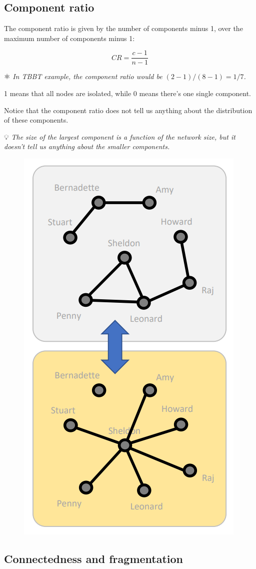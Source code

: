 \documentclass[
  notitlepage,
  onecolumn,
  openany]{book}
\begin{document}
\hypertarget{component-ratio}{%
\subsection{Component ratio}\label{component-ratio}}

The component ratio is given by the number of components minus 1, over the maximum number of components minus 1:

\[
CR = \frac{c-1}{n-1}
\]

⚛️ \emph{In TBBT example, the component ratio would be \((2-1)/(8-1) = 1/7\).}

1 means that all nodes are isolated, while 0 means there's one single component.

Notice that the component ratio does not tell us anything about the distribution of these components.

💡 \emph{The size of the largest component is a function of the network size, but it doesn't tell us anything about the smaller components.}

\begin{figure}[h!]

{\centering \includegraphics[width=0.5\linewidth]{images/03-Cohesion measures/Untitled 1} 

}

\end{figure}

\hypertarget{connectedness-and-fragmentation}{%
\subsection{Connectedness and fragmentation}\label{connectedness-and-fragmentation}}
\end{document}
